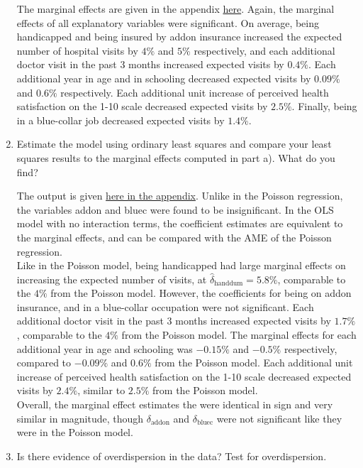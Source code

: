 \documentclass{article}
\begin{document}
\begin{enumerate}[label=(\alph*)]
The marginal effects are given in the appendix \hyperlink{margins}{here}. Again, the marginal effects of all explanatory variables were significant. On average, being handicapped and being insured by addon insurance increased the expected number of hospital visits by $4\%$ and $5\%$ respectively, and each additional doctor visit in the past 3 months increased expected visits by $0.4\%$. Each additional year in age and in schooling decreased expected visits by $0.09\%$ and $0.6\%$ respectively. Each additional unit increase of  perceived health satisfaction on the 1-10 scale decreased expected visits by $2.5\%$. Finally, being in a blue-collar job decreased expected visits by $1.4\%$.

\newpage

\item Estimate the model using ordinary least squares and compare your least squares results to the marginal effects computed in part a). What do you find?

The output is given \hyperlink{ols}{here in the appendix}. Unlike in the Poisson regression, the variables addon and bluec were found to be insignificant. In the OLS model with no interaction terms, the coefficient estimates are equivalent to the marginal effects, and can be compared with the AME of the Poisson regression. \\

Like in the Poisson model, being handicapped had large marginal effects on increasing the expected number of visits, at $\hat{\delta}_{\text{handdum}} =5.8 \% $, comparable to the $4\%$ from the Poisson model. However, the coefficients for being on addon insurance, and in a blue-collar occupation were not significant. Each additional doctor visit in the past 3 months increased expected visits by $1.7\%$, comparable to the $4\%$ from the Poisson model. The marginal effects for each additional year in age and schooling was $-0.15\%$ and $-0.5\%$ respectively, compared to $-0.09\%$ and $0.6\%$ from the Poisson model. Each additional unit increase of  perceived health satisfaction on the 1-10 scale decreased expected visits by $2.4\%$, similar to $2.5\%$ from the Poisson model.\\

Overall, the marginal effect estimates the were identical in sign and very similar in magnitude, though $\delta_{\text{addon}}$ and $\delta_{\text{bluec}}$ were not significant like they were in the Poisson model.



\item Is there evidence of overdispersion in the data? Test for overdispersion.\\


\end{enumerate}
\end{document}
